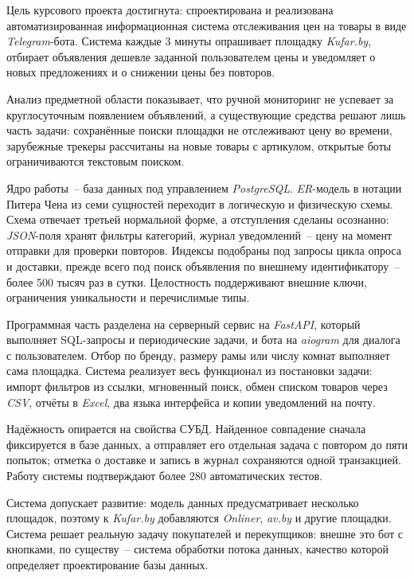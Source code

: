 
Цель курсового проекта достигнута: спроектирована и реализована автоматизированная информационная система отслеживания цен на товары в виде \textit{Telegram}-бота. Система каждые 3 минуты опрашивает площадку \textit{Kufar.by}, отбирает объявления дешевле заданной пользователем цены и уведомляет о новых предложениях и о снижении цены без повторов.

Анализ предметной области показывает, что ручной мониторинг не успевает за круглосуточным появлением объявлений, а существующие средства решают лишь часть задачи: сохранённые поиски площадки не отслеживают цену во времени, зарубежные трекеры рассчитаны на новые товары с артикулом, открытые боты ограничиваются текстовым поиском.

Ядро работы~-- база данных под управлением \textit{PostgreSQL}. \textit{ER}-модель в нотации Питера Чена из семи сущностей переходит в логическую и физическую схемы. Схема отвечает третьей нормальной форме, а отступления сделаны осознанно: \textit{JSON}-поля хранят фильтры категорий, журнал уведомлений~-- цену на момент отправки для проверки повторов. Индексы подобраны под запросы цикла опроса и доставки, прежде всего под поиск объявления по внешнему идентификатору~-- более 500 тысяч раз в сутки. Целостность поддерживают внешние ключи, ограничения уникальности и перечислимые типы.

Программная часть разделена на серверный сервис на \textit{FastAPI}, который выполняет SQL-запросы и периодические задачи, и бота на \textit{aiogram} для диалога с пользователем. Отбор по бренду, размеру рамы или числу комнат выполняет сама площадка. Система реализует весь функционал из постановки задачи: импорт фильтров из ссылки, мгновенный поиск, обмен списком товаров через \textit{CSV}, отчёты в \textit{Excel}, два языка интерфейса и копии уведомлений на почту.

Надёжность опирается на свойства СУБД. Найденное совпадение сначала фиксируется в базе данных, а отправляет его отдельная задача с повтором до пяти попыток; отметка о доставке и запись в журнал сохраняются одной транзакцией. Работу системы подтверждают более 280 автоматических тестов.

Система допускает развитие: модель данных предусматривает несколько площадок, поэтому к \textit{Kufar.by} добавляются \textit{Onliner}, \textit{av.by} и другие площадки. Система решает реальную задачу покупателей и перекупщиков: внешне это бот с кнопками, по существу~-- система обработки потока данных, качество которой определяет проектирование базы данных.
